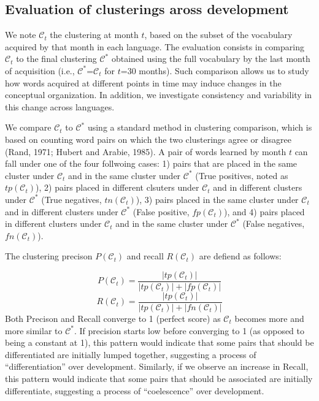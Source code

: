 \documentclass[11pt]{article}
\begin{document}
\subsection{Evaluation of clusterings aross
development}\label{evaluation-of-clusterings-aross-development}

We note \(\mathcal{C}_t\) the clustering at month \(t\), based on the
subset of the vocabulary acquired by that month in each language. The
evaluation consists in comparing \(\mathcal{C}_t\) to the final
clustering \(\mathcal{C}^*\) obtained using the full vocabulary by the
last month of acquisition (i.e., \(\mathcal{C}^*\)=\(\mathcal{C}_t\) for
\(t\)=30 months). Such comparison allows us to study how words acquired
at different points in time may induce changes in the conceptual
organization. In addition, we investigate consistency and variability in
this change across languages.

We compare \(\mathcal{C}_t\) to \(\mathcal{C}^*\) using a standard
method in clustering comparison, which is based on counting word pairs
on which the two clusterings agree or disagree (Rand, 1971; Hubert and
Arabie, 1985). A pair of words learned by month \(t\) can fall under one
of the four follwoing cases: 1) pairs that are placed in the same
cluster under \(\mathcal{C}_t\) and in the same cluster under
\(\mathcal{C}^*\) (True positives, noted as \(tp(\mathcal{C}_t)\)), 2)
pairs placed in different clsuters under \(\mathcal{C}_t\) and in
different clusters under \(\mathcal{C}^*\) (True negatives,
\(tn(\mathcal{C}_t)\)), 3) pairs placed in the same cluster under
\(\mathcal{C}_t\) and in different clusters under \(\mathcal{C}^*\)
(False positive, \(fp(\mathcal{C}_t)\)), and 4) pairs placed in
different clusters under \(\mathcal{C}_t\) and in the same cluster under
\(\mathcal{C}^*\) (False negatives, \(fn(\mathcal{C}_t)\)).

The clustering precison \(P(\mathcal{C}_t)\) and recall
\(R(\mathcal{C}_t)\) are defiend as follows:

\[
P(\mathcal{C}_t) = \frac{|tp(\mathcal{C}_t)|}{|tp(\mathcal{C}_t)| + |fp(\mathcal{C}_t)|}
\] \[
R(\mathcal{C}_t) = \frac{|tp(\mathcal{C}_t)|}{|tp(\mathcal{C}_t)| + |fn(\mathcal{C}_t)|}
\] Both Precison and Recall converge to 1 (perfect score) as
\(\mathcal{C}_t\) becomes more and more similar to \(\mathcal{C}^*\). If
precision starts low before converging to 1 (as opposed to being a
constant at 1), this pattern would indicate that some pairs that should
be differentiated are initially lumped together, suggesting a process of
``differentiation'' over development. Similarly, if we observe an
increase in Recall, this pattern would indicate that some pairs that
should be associated are initially differentiate, suggesting a process
of ``coelescence'' over development.
\end{document}
